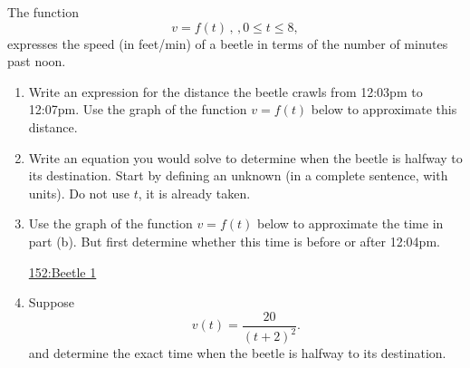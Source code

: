 \documentclass{ximera}
\begin{document}
\begin{question} \label{QPfeEFVVD}

The function 
\[
 v=f(t) \, , \, , 0 \leq t \leq 8, 
\]
expresses the speed (in feet/min) of a beetle in terms of the number of minutes past noon.

\begin{enumerate}

\item Write an expression for the distance the beetle crawls from 12:03pm to 12:07pm. Use the graph of the function $v=f(t)$ below to approximate this distance.

\item Write an equation you would solve to determine when the beetle is halfway to its destination. Start by defining an unknown (in a complete sentence, with units). Do not use $t$, it is already taken.

\item Use the graph of the function $v=f(t)$ below to approximate the time in part (b). But first determine whether this time is before or after 12:04pm.

\begin{onlineOnly}
    \begin{center}
\end{center}
\end{onlineOnly}

\href{https://www.desmos.com/calculator/gd54bqgk6l}{152:Beetle 1}


\item Suppose 
\[
      v(t) = \frac{20}{(t+2)^2}. 
\] 
and determine the exact time when the beetle is halfway to its destination.



\end{enumerate}

\end{question}
\end{document}
